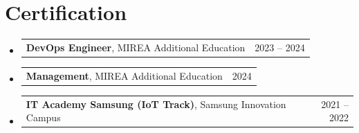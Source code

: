 \documentclass[letterpaper,11pt]{article}
\makeatletter
\newcommand{\certification}[3]{
  \item
    \begin{tabular*}{0.97\textwidth}[t]{l@{\extracolsep{\fill}}r}
      \textbf{\small#1}{\small#2} & \small#3 \\
    \end{tabular*}\vspace{-10pt}
}
\makeatother
\begin{document}
 \section{Certification}
 \begin{itemize}[leftmargin=0.15in, label={}]
    \certification{DevOps Engineer}{, MIREA Additional Education}{2023 -- 2024}
    \certification{Management}{, MIREA Additional Education}{2024}
    \certification{IT Academy Samsung (IoT Track)}{, Samsung Innovation Campus}{2021 -- 2022}
    
    
 \end{itemize}


\end{document}
